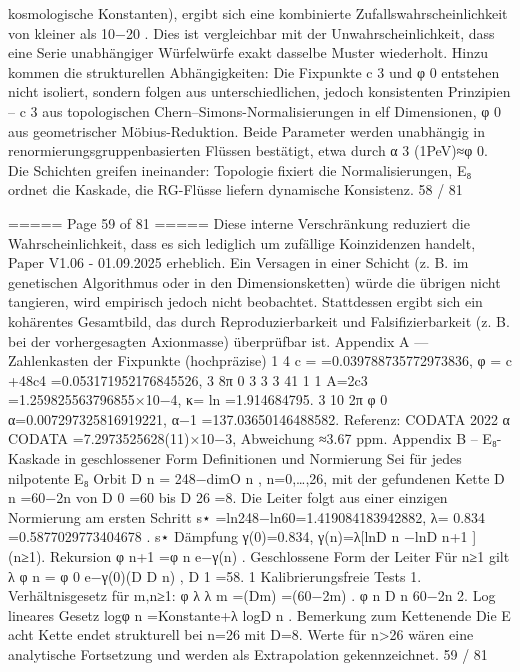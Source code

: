 \begin{MyVerbatim}
{{kosmologische Konstanten), ergibt sich eine kombinierte Zufallswahrscheinlichkeit von kleiner als
10−20
. Dies ist
vergleichbar mit der Unwahrscheinlichkeit, dass eine Serie unabhängiger Würfelwürfe exakt dasselbe Muster wiederholt.
Hinzu kommen die strukturellen Abhängigkeiten: Die Fixpunkte c 3 und φ 0 entstehen nicht isoliert, sondern folgen aus
unterschiedlichen, jedoch konsistenten Prinzipien – c 3 aus topologischen Chern–Simons-Normalisierungen in elf
Dimensionen, φ 0 aus geometrischer Möbius-Reduktion. Beide Parameter werden unabhängig in
renormierungsgruppenbasierten Flüssen bestätigt, etwa durch α 3 (1PeV)≈φ 0. Die Schichten greifen ineinander:
Topologie fixiert die Normalisierungen, E₈ ordnet die Kaskade, die RG-Flüsse liefern dynamische Konsistenz.
58 / 81

===== Page 59 of 81 =====
Diese interne Verschränkung reduziert die Wahrscheinlichkeit, dass es sich lediglich um zufällige Koinzidenzen handelt,
Paper V1.06 - 01.09.2025
erheblich. Ein Versagen in einer Schicht (z. B. im genetischen Algorithmus oder in den Dimensionsketten) würde die
übrigen nicht tangieren, wird empirisch jedoch nicht beobachtet. Stattdessen ergibt sich ein kohärentes Gesamtbild, das
durch Reproduzierbarkeit und Falsifizierbarkeit (z. B. bei der vorhergesagten Axionmasse) überprüfbar ist.
Appendix A — Zahlenkasten der Fixpunkte (hochpräzise)
1 4
c = =0.039788735772973836, φ = c +48c4 =0.053171952176845526,
3 8π 0 3 3 3
41 1 1
A=2c3 =1.259825563796855×10−4, κ= ln =1.914684795.
3 10 2π φ
0
α=0.007297325816919221, α−1 =137.03650146488582.
Referenz: CODATA 2022 α CODATA =7.2973525628(11)×10−3,
Abweichung ≈3.67 ppm.
Appendix B – E₈-Kaskade in geschlossener Form
Definitionen und Normierung
Sei für jedes nilpotente E₈ Orbit
D
n
= 248−dimO
n
, n=0,…,26,
mit der gefundenen Kette D n =60−2n von D 0 =60 bis D 26 =8.
Die Leiter folgt aus einer einzigen Normierung am ersten Schritt
s⋆ =ln248−ln60=1.419084183942882, λ= 0.834 =0.5877029773404678 .
s⋆
Dämpfung
γ(0)=0.834, γ(n)=λ[lnD
n
−lnD
n+1
] (n≥1).
Rekursion
φ n+1 =φ n e−γ(n) .
Geschlossene Form der Leiter
Für n≥1 gilt
λ
φ
n
= φ
0
e−γ(0)(D
D
n) , D
1
=58.
1
Kalibrierungsfreie Tests
1. Verhältnisgesetz für m,n≥1:
φ λ λ
m =(Dm) =(60−2m)
.
φ n D n 60−2n
2. Log lineares Gesetz
logφ n =Konstante+λ logD n .
Bemerkung zum Kettenende
Die E acht Kette endet strukturell bei n=26 mit D=8. Werte für n>26 wären eine analytische Fortsetzung und werden
als Extrapolation gekennzeichnet.
59 / 81

}}
\end{MyVerbatim}
